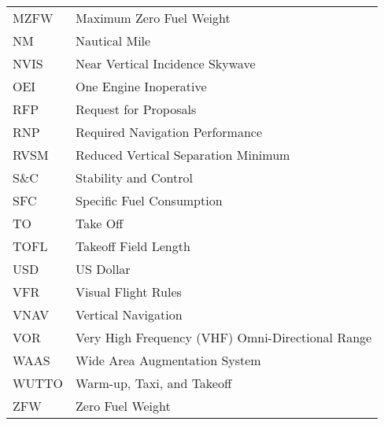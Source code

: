 {\begin{longtable*}{@{}l @{\quad=\quad} l@{}}
    MZFW & Maximum Zero Fuel Weight \\
    NM & Nautical Mile  \\ %
    NVIS & Near Vertical Incidence Skywave \\
    OEI & One Engine Inoperative \\
    RFP & Request for Proposals \\
    RNP & Required Navigation Performance \\
    RVSM & Reduced Vertical Separation Minimum \\
    S\&C & Stability and Control \\
    SFC & Specific Fuel Consumption \\
    TO & Take Off \\
    TOFL & Takeoff Field Length \\
    USD & US Dollar \\
    VFR & Visual Flight Rules \\
    VNAV & Vertical Navigation \\
    VOR & Very High Frequency (VHF) Omni-Directional Range \\
    WAAS & Wide Area Augmentation System \\
    WUTTO & Warm-up, Taxi, and Takeoff \\
    ZFW & Zero Fuel Weight\\
\end{longtable*}}


